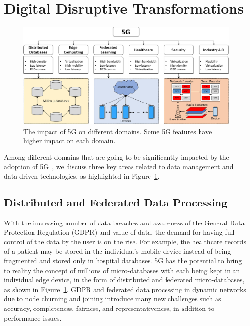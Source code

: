 \documentclass[11pt]{article}
\begin{document}
\section{Digital Disruptive Transformations}
\label{sec:impact}


\begin{figure}[tp]
\centering
\includegraphics[width=\textwidth]{letters/5GImpact_Bulletin.png}
\caption{The impact of 5G on different domains. Some 5G features have higher impact on each domain.}
\label{fig:5gimpact}
\end{figure}

\vspace{-1mm}
Among different domains that are going to be significantly impacted by the
adoption of 5G~\cite{5g_our_article}, we discuss three key areas related to data
management and data-driven technologies, as highlighted in
Figure~\ref{fig:5gimpact}.

\vspace{-2mm}
\subsection{Distributed and Federated Data Processing}
\vspace{-1mm}

With the increasing number of data breaches and awareness of the General Data
Protection Regulation (GDPR) and value of data, the demand for having full
control of the data by the user is on the rise. For example, the healthcare
records of a patient may be stored in the individual's mobile device instead of
being fragmented and stored only in hospital databases. 5G has the potential to
bring to reality the concept of millions of micro-databases with each being kept
in an individual edge device, in the form of distributed and federated
micro-databases, as shown in Figure~\ref{fig:5gimpact}. GDPR and federated data
processing in dynamic networks due to node churning and joining introduce many
new challenges such as accuracy, completeness, fairness, and representativeness,
in addition to performance issues.
\end{document}
